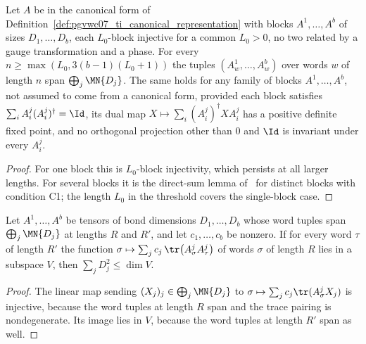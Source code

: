 \begin{lemma}%
    \label{lem:pgvwc07_block_tuple_span}
    \leanok
    Let $A$ be in the canonical form of
    Definition~\ref{def:pgvwc07_ti_canonical_representation} with blocks
    $A^1,\ldots,A^b$ of sizes $D_1,\ldots,D_b$, each $L_0$-block injective for a
    common $L_0>0$, no two related by a gauge transformation and a phase. For every
    $n\geq\max(L_0,3(b-1)(L_0+1))$ the tuples $(A^1_{w},\ldots,A^b_{w})$ over words
    $w$ of length $n$ span $\bigoplus_{j}\MN{D_j}$.
    The same holds for any family of blocks $A^1,\ldots,A^b$, not assumed to come
    from a canonical form, provided each block satisfies
    $\sum_iA^j_i(A^j_i)^\dagger=\Id$, its dual map
    $X\mapsto\sum_i(A^j_i)^\dagger XA^j_i$ has a positive definite fixed point, and
    no orthogonal projection other than $0$ and $\Id$ is invariant under every
    $A^j_i$.
\end{lemma}

\begin{proof}
    \leanok
    For one block this is $L_0$-block injectivity, which persists at all larger
    lengths. For several blocks it is the direct-sum lemma
    of~\cite{PerezGarcia2007Matrix} for distinct blocks with condition C1; the
    length $L_0$ in the threshold covers the single-block case.
\end{proof}

\begin{lemma}\label{lem:pgvwc07_cut_rank_lower_bound}
    \leanok
    Let $A^1,\ldots,A^b$ be tensors of bond dimensions $D_1,\ldots,D_b$ whose word
    tuples span $\bigoplus_j\MN{D_j}$ at lengths $R$ and $R'$, and let
    $c_1,\ldots,c_b$ be nonzero. If for every word $\tau$ of length $R'$ the
    function $\sigma\mapsto\sum_j c_j\,\tr\bigl(A^j_{\sigma}A^j_{\tau}\bigr)$ of
    words $\sigma$ of length $R$ lies in a subspace $V$, then
    $\sum_jD_j^2\leq\dim V$.
\end{lemma}

\begin{proof}
    \leanok
    The linear map sending $(X_j)_j\in\bigoplus_j\MN{D_j}$ to
    $\sigma\mapsto\sum_jc_j\tr(A^j_\sigma X_j)$ is injective, because the word
    tuples at length $R$ span and the trace pairing is nondegenerate. Its image
    lies in $V$, because the word tuples at length $R'$ span as well.
\end{proof}

